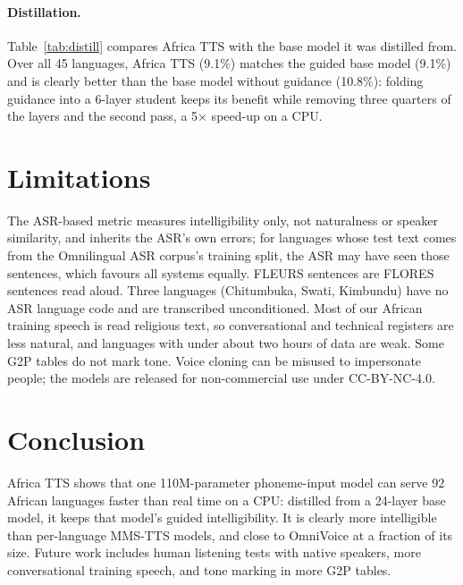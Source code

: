 \documentclass[10pt,twocolumn]{article}
\newcommand{\att}{Africa TTS}
\newcommand{\distN}{45}
\newcommand{\distturbo}{9.1}
\newcommand{\distguided}{9.1}
\newcommand{\distunguided}{10.8}
\begin{document}
\paragraph{Distillation.} Table~\ref{tab:distill} compares \att{} with the base model it was
distilled from. Over all \distN{} languages, \att{} (\distturbo{}\%) matches the guided base
model (\distguided{}\%) and is clearly better than the base model without guidance
(\distunguided{}\%): folding guidance into a 6-layer student keeps its benefit while removing
three quarters of the layers and the second pass, a 5$\times$ speed-up on a CPU.

\section{Limitations}
The ASR-based metric measures intelligibility only, not naturalness or speaker similarity, and
inherits the ASR's own errors; for languages whose test text comes from the Omnilingual ASR
corpus's training split, the ASR may have seen those sentences, which favours all systems
equally. FLEURS sentences are FLORES sentences read aloud. Three languages (Chitumbuka, Swati,
Kimbundu) have no ASR language code and are transcribed unconditioned. Most of our African
training speech is read religious text, so conversational and technical registers are less
natural, and languages with under about two hours of data are weak. Some G2P tables do not
mark tone. Voice cloning can be
misused to impersonate people; the models are released for non-commercial use under
CC-BY-NC-4.0.

\section{Conclusion}
\att{} shows that one 110M-parameter phoneme-input model can serve 92 African languages
faster than real time on a CPU: distilled from a 24-layer base model, it keeps that model's
guided intelligibility. It
is clearly more intelligible than per-language MMS-TTS models, and close to OmniVoice at a
fraction of its size. Future work includes
human listening tests with native speakers, more conversational training speech, and tone
marking in more G2P tables.




\onecolumn
\appendix
\end{document}

